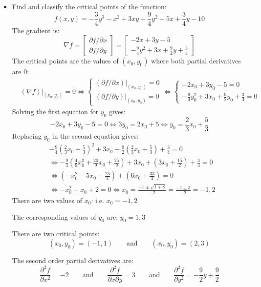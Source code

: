 \documentclass{article}
\begin{document}
\begin{itemize}
\item Find and classify the critical points of the function:
\[f(x,y) = -\frac{3}{4}y^3 - x^2 + 3xy + \frac{9}{4}y^2 - 5x + \frac{3}{4}y - 10\]
The gradient is:
\[\nabla f = \begin{bmatrix} \partial f/\partial x \\ \partial f/\partial y \end{bmatrix} = \begin{bmatrix} -2x + 3y - 5 \\ -\frac{9}{4}y^2 + 3x + \frac{9}{2}y + \frac{3}{4} \end{bmatrix}\]
The critical points are the values of \((x_0, y_0)\) where both partial derivatives are \(0\):
\begin{align*}
& (\nabla f)\Big|_{(x_0, y_0)} = 0 
\iff \left\{\begin{array}{c} (\partial f/\partial x)|_{(x_0, y_0)} = 0 \\ (\partial f/\partial y)|_{(x_0, y_0)} = 0 \end{array}\right. 
\iff \left\{\begin{array}{c} -2x_0 + 3y_0 - 5 = 0 \\ -\frac{9}{4}y_0^2 + 3x_0 + \frac{9}{2}y_0 + \frac{3}{4} = 0 \end{array}\right. 
\end{align*}
Solving the first equation for \(y_0\) gives: 
\[-2x_0 + 3y_0 - 5 = 0 \iff 3y_0 = 2x_0 + 5 \iff y_0 = \frac{2}{3}x_0 + \frac{5}{3}\]
Replacing \(y_0\) in the second equation gives:
\begin{align*} 
& -\frac{9}{4}(\frac{2}{3}x_0 + \frac{5}{3})^2 + 3x_0 + \frac{9}{2}(\frac{2}{3}x_0 + \frac{5}{3}) + \frac{3}{4} = 0 \\ 
& \iff -\frac{9}{4}(\frac{4}{9}x_0^2 + \frac{20}{9}x_0 + \frac{25}{9}) + 3x_0 + (3x_0 + \frac{15}{2}) + \frac{3}{4} = 0 \\  
& \iff (-x_0^2 - 5x_0 - \frac{25}{4}) + (6x_0 + \frac{33}{4}) = 0 \\
& \iff -x_0^2 + x_0 + 2 = 0 
\iff x_0 = \frac{-1 \pm \sqrt{1 + 8}}{-2} = \frac{-1 \pm 3}{-2} = -1, 2
\end{align*}  
There are two values of \(x_0\): i.e. \(x_0 = -1, 2\)

The corresponding values of \(y_0\) are: \(y_0 = 1, 3\) 

There are two critical points:
\[(x_0, y_0) = (-1, 1) \quad\quad\text{and}\quad\quad (x_0, y_0) = (2, 3)\]

The second order partial derivatives are:
\[\frac{\partial^2 f}{\partial x^2} = -2 \quad\quad\text{and}\quad\quad \frac{\partial^2 f}{\partial x \partial y} = 3 \quad\quad\text{and}\quad\quad \frac{\partial^2 f}{\partial y^2} = -\frac{9}{2}y + \frac{9}{2}\]


\end{itemize}
\end{document}
